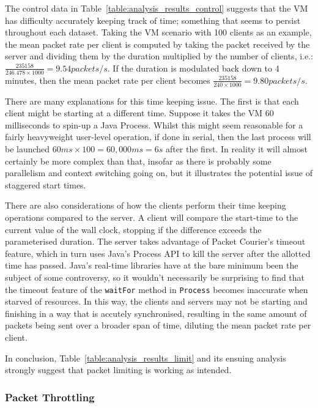 The control data in Table~\ref{table:analysis_results_control} suggests that the VM has difficulty accurately keeping
track of time; something that seems to persist throughout each dataset. Taking the VM scenario with 100 clients as an
example, the mean packet rate per client is computed by taking the packet received by the server and dividing them by
the duration multiplied by the number of clients, i.e.: $\frac{235158}{246.478 \times 1000} = 9.54 packets/s$. If the
duration is modulated back down to 4 minutes, then the mean packet rate per client becomes
$\frac{235158}{240 \times 1000} = 9.80 packets/s$.

There are many explanations for this time keeping issue. The first is that each client might be starting at a
different time. Suppose it takes the VM 60 milliseconds to spin-up a Java Process\cite{java_Process}. Whilst this
might seem reasonable for a fairly heavyweight user-level operation, if done in serial, then the last process will be
launched $60ms \times 100 = 60,000ms = 6s$ after the first. In reality it will almost certainly be more complex than
that, insofar as there is probably some parallelism and context switching going on, but it illustrates the potential
issue of staggered start times.

There are also considerations of how the clients perform their time keeping operations compared to the server. A
client will compare the start-time to the current value of the wall clock, stopping if the difference exceeds the
parameterised duration. The server takes advantage of Packet Courier's timeout feature, which in turn uses Java's
Process\cite{java_Process} API to kill the server after the allotted time has passed. Java's real-time libraries have
at the bare minimum been the subject of some controversy\cite{java_timeout_reliability}, so it wouldn't necessarily
be surprising to find that the timeout feature of the \texttt{waitFor} method in \texttt{Process} becomes inaccurate
when starved of resources. In this way, the clients and servers may not be starting and finishing in a way that is
accutely synchronised, resulting in the same amount of packets being sent over a broader span of time, diluting the
mean packet rate per client.

In conclusion, Table~\ref{table:analysis_results_limit} and its ensuing analysis strongly suggest that packet
limiting is working as intended.

\subsubsection{Packet Throttling}\label{subsubsection:throttle_analysis}


